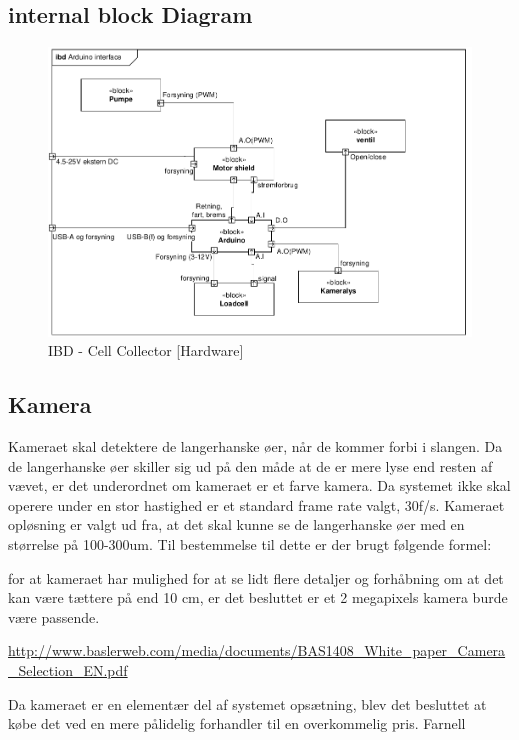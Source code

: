 \subsection{internal block Diagram} 
\begin{figure}[H]
	\centering
	\includegraphics[width=1\textwidth]{pdf/IBD_Hardware(Arduino)_cropped.pdf}
	\caption{IBD - Cell Collector [Hardware]}
	\label{fig:ibd_Hardware}
\end{figure}



\subsection{Kamera}
Kameraet skal detektere de langerhanske øer, når de kommer forbi i slangen.  Da de langerhanske øer skiller sig ud på den måde at de er mere lyse end resten af vævet, er det underordnet om kameraet er et farve kamera. Da systemet ikke skal operere under en stor hastighed er et standard frame rate valgt, 30f/s. Kameraet opløsning er valgt ud fra, at det skal kunne se de langerhanske øer med en størrelse på 100-300um. Til bestemmelse til dette er der brugt følgende formel:
 
for at kameraet har mulighed for at se lidt flere detaljer og forhåbning om at det kan være tættere på end 10 cm, er det besluttet er et 2 megapixels kamera burde være passende.

\url{http://www.baslerweb.com/media/documents/BAS1408_White_paper_Camera_Selection_EN.pdf}


Da kameraet er en elementær del af systemet opsætning, blev det besluttet at købe det ved en mere pålidelig forhandler til en overkommelig pris. Farnell


